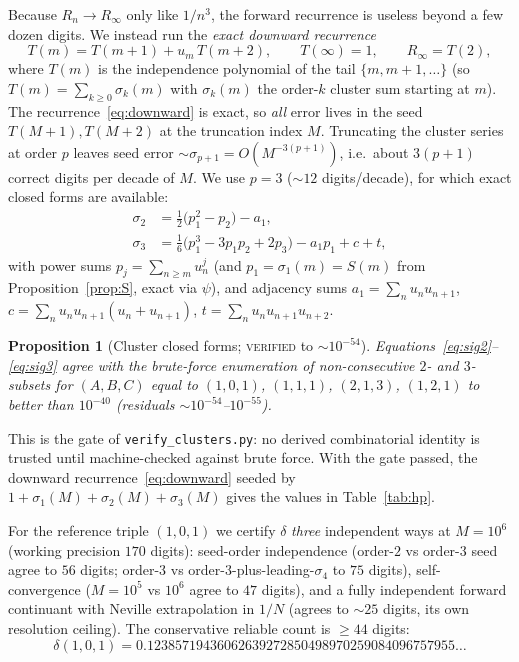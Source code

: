 \documentclass[11pt]{article}
\newtheorem{proposition}{Proposition}
\newcommand{\Rinf}{R_\infty}
\begin{document}
Because $R_n\to\Rinf$ only like $1/n^3$, the forward recurrence is useless beyond a
few dozen digits. We instead run the \emph{exact downward recurrence}
\begin{equation}\label{eq:downward}
  T(m)=T(m+1)+u_m\,T(m+2),\qquad T(\infty)=1,\qquad \Rinf=T(2),
\end{equation}
where $T(m)$ is the independence polynomial of the tail $\{m,m+1,\dots\}$ (so
$T(m)=\sum_{k\ge0}\sigma_k(m)$ with $\sigma_k(m)$ the order-$k$ cluster sum starting
at $m$). The recurrence~\eqref{eq:downward} is exact, so \emph{all} error lives in
the seed $T(M+1),T(M+2)$ at the truncation index $M$. Truncating the cluster series
at order $p$ leaves seed error $\sim\sigma_{p+1}=O(M^{-3(p+1)})$, i.e.\ about
$3(p+1)$ correct digits per decade of $M$. We use $p=3$ ($\sim12$ digits/decade),
for which exact closed forms are available:
\begin{align}
  \sigma_2 &= \tfrac12\big(p_1^2-p_2\big)-a_1, \label{eq:sig2}\\
  \sigma_3 &= \tfrac16\big(p_1^3-3p_1p_2+2p_3\big)-a_1p_1+c+t, \label{eq:sig3}
\end{align}
with power sums $p_j=\sum_{n\ge m}u_n^j$ (and $p_1=\sigma_1(m)=S(m)$ from
Proposition~\ref{prop:S}, exact via $\psi$), and adjacency sums
$a_1=\sum_n u_nu_{n+1}$, $c=\sum_n u_nu_{n+1}(u_n+u_{n+1})$,
$t=\sum_n u_nu_{n+1}u_{n+2}$.

\begin{proposition}[Cluster closed forms; \textsc{verified} to $\sim10^{-54}$]
\label{prop:sigma}
Equations~\eqref{eq:sig2}--\eqref{eq:sig3} agree with the brute-force enumeration of
non-consecutive $2$- and $3$-subsets for $(A,B,C)$ equal to $(1,0,1)$, $(1,1,1)$,
$(2,1,3)$, $(1,2,1)$
to better than $10^{-40}$ (residuals $\sim10^{-54}$--$10^{-55}$).
\end{proposition}

This is the gate of \texttt{verify\_clusters.py}: no derived combinatorial identity
is trusted until machine-checked against brute force. With the gate passed, the
downward recurrence~\eqref{eq:downward} seeded by
$1+\sigma_1(M)+\sigma_2(M)+\sigma_3(M)$ gives the values in
Table~\ref{tab:hp}.

For the reference triple $(1,0,1)$ we certify $\delta$ \emph{three} independent ways
at $M=10^6$ (working precision $170$ digits): seed-order independence (order-$2$ vs
order-$3$ seed agree to $56$ digits; order-$3$ vs order-$3$-plus-leading-$\sigma_4$
to $75$ digits), self-convergence ($M=10^5$ vs $10^6$ agree to $47$ digits), and a
fully independent forward continuant with Neville extrapolation in $1/N$ (agrees to
$\sim25$ digits, its own resolution ceiling). The conservative reliable count is
$\ge44$ digits:
\begin{equation}\label{eq:delta101}
  \delta(1,0,1)=0.12385719436062639272850498970259084096757955\ldots
\end{equation}
\end{document}
